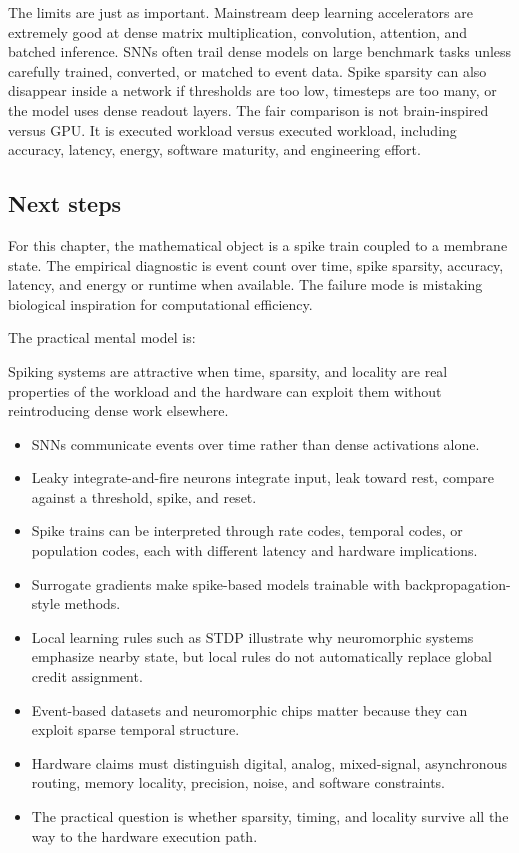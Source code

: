 The limits are just as important. Mainstream deep learning accelerators are extremely good at dense matrix multiplication, convolution, attention, and batched inference. SNNs often trail dense models on large benchmark tasks unless carefully trained, converted, or matched to event data. Spike sparsity can also disappear inside a network if thresholds are too low, timesteps are too many, or the model uses dense readout layers. The fair comparison is not brain-inspired versus GPU\@. It is executed workload versus executed workload, including accuracy, latency, energy, software maturity, and engineering effort.

\subsection{Next steps}

For this chapter, the mathematical object is a spike train coupled to a membrane state. The empirical diagnostic is event count over time, spike sparsity, accuracy, latency, and energy or runtime when available. The failure mode is mistaking biological inspiration for computational efficiency.

The practical mental model is:

\begin{aside}
Spiking systems are attractive when time, sparsity, and locality are real properties of the workload and the hardware can exploit them without reintroducing dense work elsewhere.
\end{aside}

\begin{chaptersummary}
\begin{itemize}[leftmargin=*]
  \item SNNs communicate events over time rather than dense activations alone.
  \item Leaky integrate-and-fire neurons integrate input, leak toward rest, compare against a threshold, spike, and reset.
  \item Spike trains can be interpreted through rate codes, temporal codes, or population codes, each with different latency and hardware implications.
  \item Surrogate gradients make spike-based models trainable with backpropagation-style methods.
  \item Local learning rules such as STDP illustrate why neuromorphic systems emphasize nearby state, but local rules do not automatically replace global credit assignment.
  \item Event-based datasets and neuromorphic chips matter because they can exploit sparse temporal structure.
  \item Hardware claims must distinguish digital, analog, mixed-signal, asynchronous routing, memory locality, precision, noise, and software constraints.
  \item The practical question is whether sparsity, timing, and locality survive all the way to the hardware execution path.
\end{itemize}
\end{chaptersummary}


